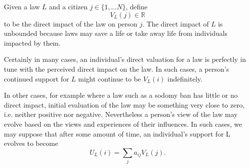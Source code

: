 Given a law $L$ and a citizen $j\in\{1,\dots N\}$, %
define $$V_L(j)\in\mathbb{R}$$ to be the direct impact of the law on person $j$. The direct  impact of $L$ is unbounded because laws may save a life or take away life from individuals impacted by them.

Certainly in many cases, an individual's direct valuation for a law is perfectly in tune with the perceived direct impact on the law.  In such cases, a person's continued support for $L$ might continue to be $V_L(i)$ indefinitely. %

In other cases, for example where a law such as a sodomy ban has little or no direct impact, initial evaluation of the law may be something very close to zero, i.e. neither positive nor negative.  Nevertheless a person's view of the law may evolve based on the views and experiences of their influences.  In such cases, we may suppose that after some amount of time, an individual's support for L evolves to become $$U_L(i)=\sum_ja_{ij}V_L(j).$$



